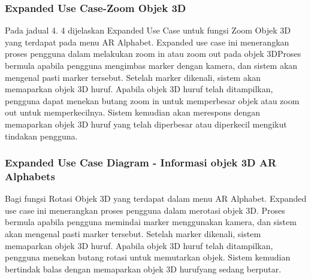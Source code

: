 \begin{itemize}
\begin{itemize}
\begin{itemize}
\begin{itemize}
\begin{itemize}
\begin{itemize}
\begin{itemize}
\begin{itemize}
\subsubsection{Expanded  Use  Case-Zoom Objek 3D}

Pada jadual 4. 4 dijelaskan Expanded Use Case untuk fungsi Zoom Objek 3D yang terdapat  pada  menu  AR  Alphabet.   Expanded  use   case  ini  menerangkan  proses pengguna dalam melakukan zoom in atau zoom out pada objek 3DProses bermula apabila pengguna mengimbas marker dengan kamera, dan sistem akan mengenal pasti marker tersebut. Setelah marker dikenali, sistem akan memaparkan objek 3D huruf. Apabila objek 3D huruf telah ditampilkan, pengguna dapat menekan butang zoom in untuk memperbesar objek atau zoom out untuk memperkecilnya. Sistem kemudian akan  merespons  dengan  memaparkan  objek  3D  huruf  yang  telah  diperbesar  atau diperkecil mengikut tindakan pengguna.





\subsubsection{ Expanded Use Case Diagram - Informasi objek 3D AR Alphabets}


Bagi fungsi Rotasi Objek 3D yang terdapat dalam menu AR Alphabet. Expanded use case  ini  menerangkan  proses  pengguna  dalam  merotasi  objek  3D. Proses  bermula apabila pengguna memindai marker menggunakan kamera, dan sistem akan mengenal pasti marker tersebut. Setelah marker dikenali, sistem memaparkan objek 3D huruf. Apabila objek 3D huruf telah ditampilkan, pengguna menekan butang rotasi untuk memutarkan objek. Sistem kemudian bertindak balas dengan memaparkan objek 3D hurufyang sedang berputar.


\end{itemize}
\end{itemize}
\end{itemize}
\end{itemize}
\end{itemize}
\end{itemize}
\end{itemize}
\end{itemize}
